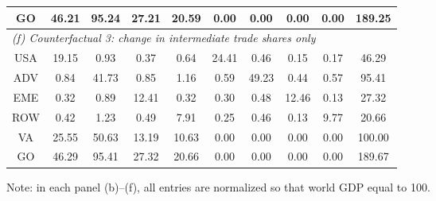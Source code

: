 \begin{table}[p]
\begin{center}
\begin{threeparttable}
\begin{tabular}{cccccccccc}
GO& 46.21& 95.24& 27.21& 20.59& 0.00& 0.00& 0.00& 0.00& 189.25\\
\midrule
\multicolumn{10}{l}{\textit{(f) Counterfactual 3: change in intermediate trade shares only}}\\
USA& 19.15& 0.93& 0.37& 0.64& 24.41& 0.46& 0.15& 0.17& 46.29 \\
ADV& 0.84& 41.73& 0.85& 1.16& 0.59& 49.23& 0.44& 0.57& 95.41 \\
EME& 0.32& 0.89& 12.41& 0.32& 0.30& 0.48& 12.46& 0.13& 27.32 \\
ROW& 0.42& 1.23& 0.49& 7.91& 0.25& 0.46& 0.13& 9.77& 20.66 \\
VA& 25.55& 50.63& 13.19& 10.63& 0.00& 0.00& 0.00& 0.00& 100.00\\
GO& 46.29& 95.41& 27.32& 20.66& 0.00& 0.00& 0.00& 0.00& 189.67\\
\bottomrule
\end{tabular}
\normalsize
\begin{tablenotes}
\small
\item Note: in each panel (b)--(f), all entries are normalized so that world GDP equal to 100.
\normalsize
\end{tablenotes}
\end{threeparttable}
\end{center}
\end{table}
